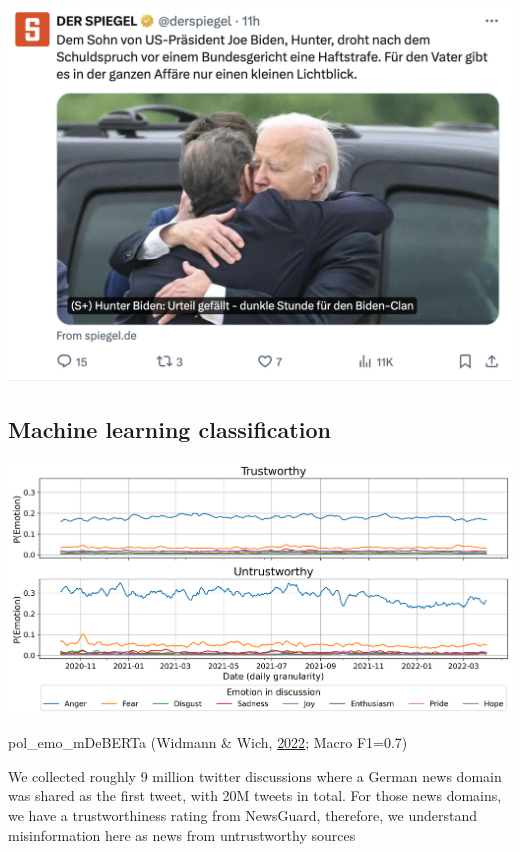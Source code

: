 \documentclass[
  letterpaper,
  DIV=11,
  numbers=noendperiod]{scrartcl}
\begin{document}
\includegraphics[width=6.25in,height=\textheight]{images/spon.png}

\hypertarget{machine-learning-classification}{%
\subsection{Machine learning
classification}\label{machine-learning-classification}}

\includegraphics[width=6.25in,height=\textheight]{images/daily_emotions_rating_smoothed.png}

pol\_emo\_mDeBERTa (Widmann \& Wich,
\href{https://doi.org/10.1017/pan.2022.15}{2022}; Macro F1=0.7)

We collected roughly 9 million twitter discussions where a German news
domain was shared as the first tweet, with 20M tweets in total. For
those news domains, we have a trustworthiness rating from NewsGuard,
therefore, we understand misinformation here as news from untrustworthy
sources
\end{document}

